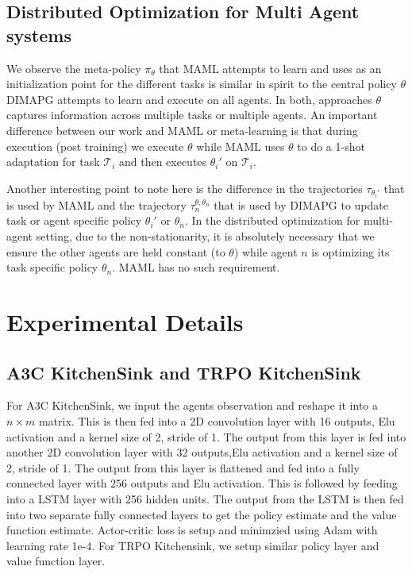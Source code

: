 \documentclass{article}
\begin{document}
\subsection{Distributed Optimization for Multi Agent systems}
We observe the meta-policy $\pi_{\theta}$ that MAML attempts to learn and uses as an initialization point for the different tasks is similar in spirit to the central policy $\theta$ DIMAPG attempts to learn and execute on all agents. In both, approaches $\theta$ captures information across multiple tasks or multiple agents. An important difference between our work and MAML or meta-learning is that during execution (post training) we execute $\theta$ while MAML uses $\theta$ to do a 1-shot adaptation for task $\mathcal{T}_i$ and then executes $\theta_i'$ on $\mathcal{T}_i$.

Another interesting point to note here is the difference in the trajectories $\tau_{\theta_i'}$ that is used by MAML and the trajectory $\tau_{n}^{\theta,\theta_n}$ that is used by DIMAPG to update task or agent specific policy $\theta_i'$ or $\theta_n$. In the distributed optimization for multi-agent setting, due to the non-stationarity, it is absolutely necessary that we ensure the other agents are held constant (to $\theta$) while agent $n$ is optimizing its task specific policy $\theta_n$. MAML has no such requirement.

\section{Experimental Details}
\subsection{A3C KitchenSink and TRPO KitchenSink}
For A3C KitchenSink, we input the agents observation and reshape it into a $n \times m$ matrix. This is then fed into a 2D convolution layer with 16 outputs, Elu activation and a kernel size of 2, stride of 1. The output from this layer is fed into another 2D convolution layer with 32 outputs,Elu activation and a kernel size of 2, stride of 1. The output from this layer is flattened and fed into a fully connected layer with 256 outputs and Elu activation. This is followed by feeding into a LSTM layer with 256 hidden units. The output from the LSTM is then fed into two separate fully connected layers to get the policy estimate and the value function estimate. Actor-critic loss is setup and minimzied using Adam with learning rate 1e-4. For TRPO Kitchensink, we setup similar policy layer and value function layer.
\end{document}
